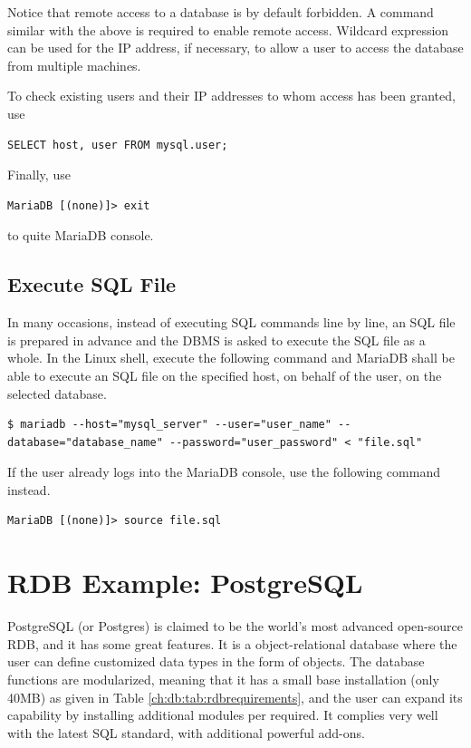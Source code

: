 Notice that remote access to a database is by default forbidden. A command similar with the above is required to enable remote access. Wildcard expression can be used for the IP address, if necessary, to allow a user to access the database from multiple machines.

To check existing users and their IP addresses to whom access has been granted, use
\begin{lstlisting}
SELECT host, user FROM mysql.user;
\end{lstlisting}

Finally, use
\begin{lstlisting}
MariaDB [(none)]> exit
\end{lstlisting}
to quite MariaDB console.

\subsection{Execute SQL File}

In many occasions, instead of executing SQL commands line by line, an SQL file is prepared in advance and the DBMS is asked to execute the SQL file as a whole. In the Linux shell, execute the following command and MariaDB shall be able to execute an SQL file on the specified host, on behalf of the user, on the selected database.
\begin{lstlisting}
$ mariadb --host="mysql_server" --user="user_name" --database="database_name" --password="user_password" < "file.sql"
\end{lstlisting}
If the user already logs into the MariaDB console, use the following command instead.
\begin{lstlisting}
MariaDB [(none)]> source file.sql
\end{lstlisting}

\section{RDB Example: PostgreSQL}

PostgreSQL (or Postgres) is claimed to be the world's most advanced open-source RDB, and it has some great features. It is a object-relational database where the user can define customized data types in the form of objects. The database functions are modularized, meaning that it has a small base installation (only 40MB) as given in Table \ref{ch:db:tab:rdbrequirements}, and the user can expand its capability by installing additional modules per required. It complies very well with the latest SQL standard, with additional powerful add-ons.

